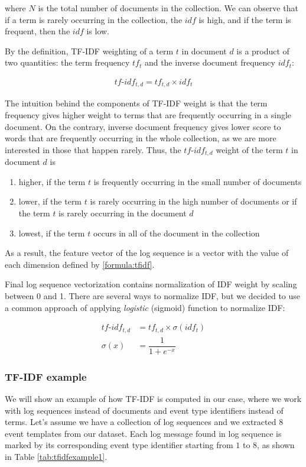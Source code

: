 where $N$ is the total number of documents in the collection. We can observe that if a term is rarely occurring in the collection, the $idf$ is high, and if the term is frequent, then the $idf$ is low.

By the definition, TF-IDF weighting of a term $t$ in document $d$ is a product of two quantities: the term frequency $tf_t$ and the inverse document frequency $idf_t$:

\begin{gather}
    tf\text{-}idf_{t, d} = tf_{t,d} \times idf_t
    \label{formula:tfidf}
\end{gather}

The intuition behind the components of TF-IDF weight is that the term frequency gives higher weight to terms that are frequently occurring in a single document. On the contrary, inverse document frequency gives lower score to words that are frequently occurring in the whole collection, as we are more interested in those that happen rarely. Thus, the $tf\text{-}idf_{t, d}$ weight of the term $t$ in document $d$ is 

\begin{enumerate}
    \item higher, if the term $t$ is frequently occurring in the small number of documents
    \item lower, if the term $t$ is rarely occurring in the high number of documents or if the term $t$ is rarely occurring in the document $d$
    \item lowest, if the term $t$ occurs in all of the document in the collection
\end{enumerate}

As a result, the feature vector of the log sequence is a vector with the value of each dimension defined by \ref{formula:tfidf}.

Final log sequence vectorization contains normalization of IDF weight by scaling between 0 and 1. There are several ways to normalize IDF, but we decided to use a common approach of applying \textit{logistic} (sigmoid) function to normalize IDF:

\begin{align*}
    tf\text{-}idf_{t, d} &= tf_{t,d} \times \sigma(idf_t) \\
    \sigma(x) &= \dfrac{1}{1 + e^{-x}}
\end{align*}

\subsubsection*{TF-IDF example}
We will show an example of how TF-IDF is computed in our case, where we work with log sequences instead of documents and event type identifiers instead of terms. Let's assume we have a collection of log sequences and we extracted $8$ event templates from our dataset. Each log message found in log sequence is marked by its corresponding event type identifier starting from $1$ to $8$, as shown in Table \ref{tab:tfidfexample1}.

